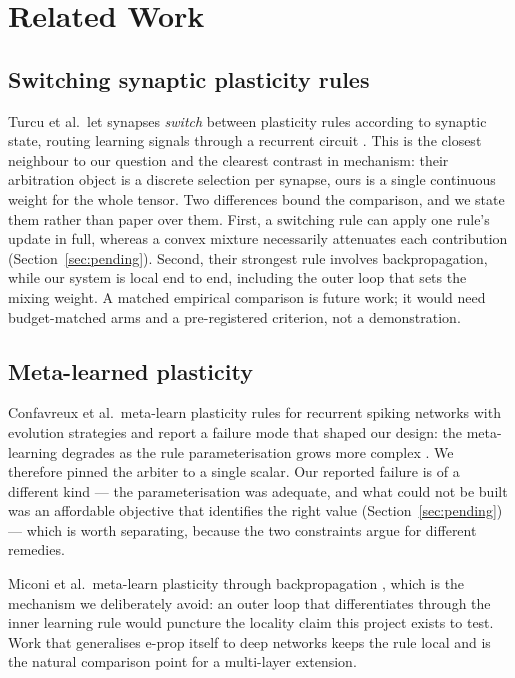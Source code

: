 \documentclass[11pt]{article}
\begin{document}
\section{Related Work}

\subsection{Switching synaptic plasticity rules}

Turcu et al.\ let synapses \emph{switch} between plasticity rules according to synaptic state,
routing learning signals through a recurrent circuit \citep{turcu2025switching}. This is the
closest neighbour to our question and the clearest contrast in mechanism: their arbitration object
is a discrete selection per synapse, ours is a single continuous weight for the whole tensor.
Two differences bound the comparison, and we state them rather than paper over them. First, a
switching rule can apply one rule's update in full, whereas a convex mixture necessarily attenuates
each contribution (Section~\ref{sec:pending}). Second, their strongest rule involves
backpropagation, while our system is local end to end, including the outer loop that sets the
mixing weight. A matched empirical comparison is future work; it would need budget-matched arms
and a pre-registered criterion, not a demonstration.

\subsection{Meta-learned plasticity}

Confavreux et al.\ meta-learn plasticity rules for recurrent spiking networks with evolution
strategies and report a failure mode that shaped our design: the meta-learning degrades as the
rule parameterisation grows more complex \citep{confavreux2025}. We therefore pinned the arbiter to
a single scalar. Our reported failure is of a different kind --- the parameterisation was adequate,
and what could not be built was an affordable objective that identifies the right value
(Section~\ref{sec:pending}) --- which is worth separating, because the two constraints argue for
different remedies.

Miconi et al.\ meta-learn plasticity through backpropagation \citep{miconi2018differentiable},
which is the mechanism we deliberately avoid: an outer loop that differentiates through the inner
learning rule would puncture the locality claim this project exists to test. Work that generalises
e-prop itself to deep networks \citep{millidge2025deep} keeps the rule local and is the natural
comparison point for a multi-layer extension.
\end{document}
